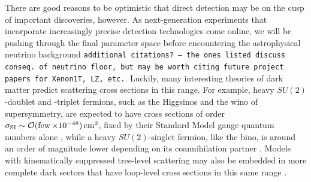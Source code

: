 \documentclass[11pt]{article}
\newcommand{\tenx}[1]{\times 10^{#1}}
\newcommand{\sjwColor}{red}
\newcommand{\sjwtt}[1]{{\color{\sjwColor}\tt #1}}
\begin{document}
There are good reasons to be optimistic that direct detection may be on the cusp of important discoveries, however. As next-generation experiments that incorporate increasingly precise detection technologies come online, we will be pushing through the final parameter space before encountering the astrophysical neutrino background \sjwtt{additional citations? -- the ones listed discuss conseq. of neutrino floor, but may be worth citing future project papers for Xenon1T, LZ, etc.}\cite{Billard:2013qya,Ruppin:2014bra,Davis:2014ama,Dent:2016iht}. Luckily, many interesting theories of dark matter predict scattering cross sections in this range. For example, heavy $SU(2)$-doublet and -triplet fermions, such as the Higgsinos and the wino of supersymmetry, are expected to have cross sections of order $\sigma_{\rm SI} \sim \cO(\few\tenx{-48})\cm^2$, fixed by their Standard Model gauge quantum numbers alone \cite{Hill:2011be,Hill:2013hoa,Hill:2014yxa}, while a heavy $SU(2)$-singlet fermion, like the bino, is around an order of magnitude lower depending on its coannihilation partner \cite{Berlin:2015njh}. Models with kinematically suppressed tree-level scattering may also be embedded in more complete dark sectors that have loop-level cross sections in this same range \cite{Ipek:2014gua,McDermott:2014rqa,Appelquist:2015yfa,Appelquist:2015zfa}.
\end{document}

